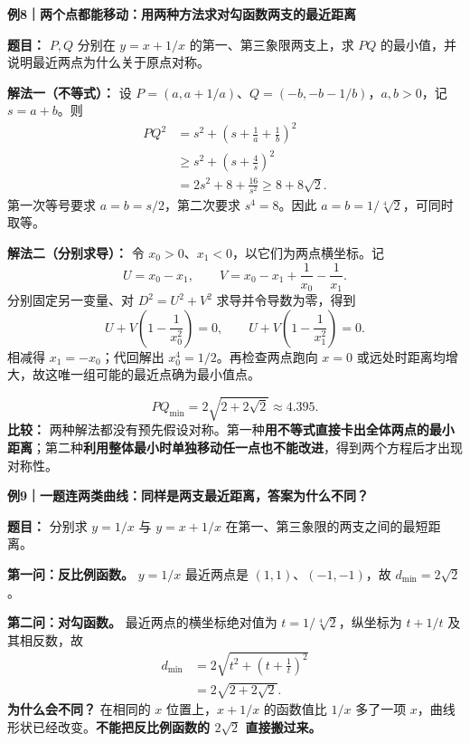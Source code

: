 \clearpage
\begin{examplebox}
\textbf{例8｜两个点都能移动：用两种方法求对勾函数两支的最近距离}

\textbf{题目：} $P,Q$ 分别在 $y=x+1/x$ 的第一、第三象限两支上，求 $PQ$ 的最小值，并说明最近两点为什么关于原点对称。

\textbf{解法一（不等式）：} 设 $P=(a,a+1/a)$、$Q=(-b,-b-1/b)$，$a,b>0$，记 $s=a+b$。则
\[
\begin{aligned}
PQ^2&=s^2+\left(s+\frac1a+\frac1b\right)^2\\
&\ge s^2+\left(s+\frac4s\right)^2\\
&=2s^2+8+\frac{16}{s^2}\ge8+8\sqrt2.
\end{aligned}
\]
第一次等号要求 $a=b=s/2$，第二次要求 $s^4=8$。因此 $a=b=1/\sqrt[4]2$，可同时取等。

\textbf{解法二（分别求导）：} 令 $x_0>0$、$x_1<0$，以它们为两点横坐标。记
\[
U=x_0-x_1,\qquad V=x_0-x_1+\frac1{x_0}-\frac1{x_1}.
\]
分别固定另一变量、对 $D^2=U^2+V^2$ 求导并令导数为零，得到
\[
U+V\left(1-\frac1{x_0^2}\right)=0,
\qquad
U+V\left(1-\frac1{x_1^2}\right)=0.
\]
相减得 $x_1=-x_0$；代回解出 $x_0^4=1/2$。再检查两点跑向 $x=0$ 或远处时距离均增大，故这唯一组可能的最近点确为最小值点。

\[
\boxed{PQ_{\min}=2\sqrt{2+2\sqrt2}\approx4.395}.
\]
\textbf{比较：} 两种解法都没有预先假设对称。第一种\textbf{用不等式直接卡出全体两点的最小距离}；第二种\textbf{利用整体最小时单独移动任一点也不能改进}，得到两个方程后才出现对称性。
\end{examplebox}

\clearpage
\begin{examplebox}
\textbf{例9｜一题连两类曲线：同样是两支最近距离，答案为什么不同？}

\textbf{题目：} 分别求 $y=1/x$ 与 $y=x+1/x$ 在第一、第三象限的两支之间的最短距离。

\textbf{第一问：反比例函数。} $y=1/x$ 最近两点是 $(1,1)$、$(-1,-1)$，故 $d_{\min}=2\sqrt2$。

\textbf{第二问：对勾函数。} 最近两点的横坐标绝对值为 $t=1/\sqrt[4]2$，纵坐标为 $t+1/t$ 及其相反数，故
\[
\begin{aligned}
d_{\min}&=2\sqrt{t^2+\left(t+\frac1t\right)^2}\\
&=2\sqrt{2+2\sqrt2}.
\end{aligned}
\]
\textbf{为什么会不同？} 在相同的 $x$ 位置上，$x+1/x$ 的函数值比 $1/x$ 多了一项 $x$，曲线形状已经改变。\textbf{不能把反比例函数的 $2\sqrt2$ 直接搬过来。}
\end{examplebox}
